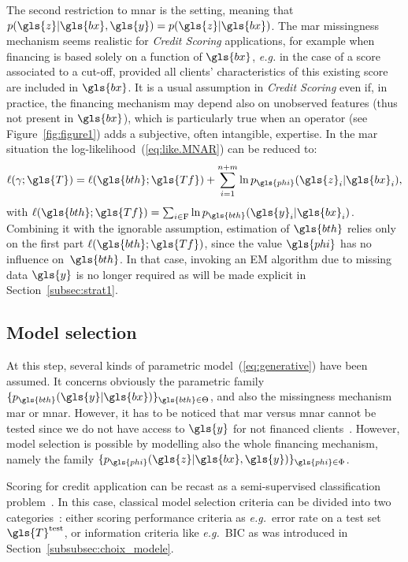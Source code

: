 The second restriction to \gls{mnar} is the  setting, meaning that $p(\gls{z}| \gls{bx},\gls{y}) = p(\gls{z}|\gls{bx})$. The \gls{mar} missingness mechanism seems realistic for \textit{Credit Scoring} applications, for example when financing is based solely on a function of $\gls{bx}$, {\it e.g.} in the case of a score associated to a cut-off, provided all clients' characteristics of this existing \gls{score} are included in $\gls{bx}$. It is a usual assumption in \textit{Credit Scoring} even if, in practice, the financing mechanism may depend also on unobserved features (thus not present in $\gls{bx}$), which is particularly true when an operator (see Figure~\ref{fig:figure1}) adds a subjective, often intangible, expertise. In the \gls{mar} situation the log-likelihood~(\ref{eq:like.MNAR}) can be reduced to:
\begin{equation}\label{eq:like.MAR}
\ell(\gamma;\gls{T}) = \ell(\gls{bth};\gls{Tf}) + \sum_{i=1}^{n+m} \ln p_{\gls{phi}}(\gls{z}_{i} | \gls{bx}_{i}),
\end{equation}
with $\ell(\gls{bth};\gls{Tf})=\sum_{i\in\text{F}}\ln p_{\gls{bth}}(\gls{y}_i | \gls{bx}_i)$.
Combining it with the ignorable assumption, estimation of $\gls{bth}$ relies only on the first part $\ell(\gls{bth};\gls{Tf})$, since the value $\gls{phi}$ has no influence on~$\gls{bth}$. In that case, invoking an EM algorithm due to missing data $\gls{y}$ is no longer required as will be made explicit in Section~\ref{subsec:strat1}.

\subsection{Model selection} \label{subsec:model_selection}

At this step, several kinds of parametric model~(\ref{eq:generative}) have been assumed. It concerns obviously the parametric family $\{p_{\gls{bth}}(\gls{y}|\gls{bx})\}_{\gls{bth} \in\Theta}$, and also the missingness mechanism \gls{mar} or \gls{mnar}. 
However, it has to be noticed that \gls{mar} versus \gls{mnar} cannot be tested since we do not have access to $\gls{y}$ for not financed clients~\cite{molenberghs2008every}. However, model selection is possible by modelling also the whole financing mechanism, namely the family $\{p_{\gls{phi}}(\gls{z}|\gls{bx},\gls{y})\}_{\gls{phi} \in \Phi}$.


Scoring for credit application can be recast as a semi-supervised classification problem~\cite{Chapelle:2010:SL:1841234}. In this case, classical model selection criteria can be divided into two categories~\cite{vandewalle:tel-00447141}: either scoring performance criteria as \textit{e.g.}\ error rate on a test set $\gls{T}^{\text{test}}$, or information criteria like \textit{e.g.}\ BIC as was introduced in Section~\ref{subsubsec:choix_modele}.

